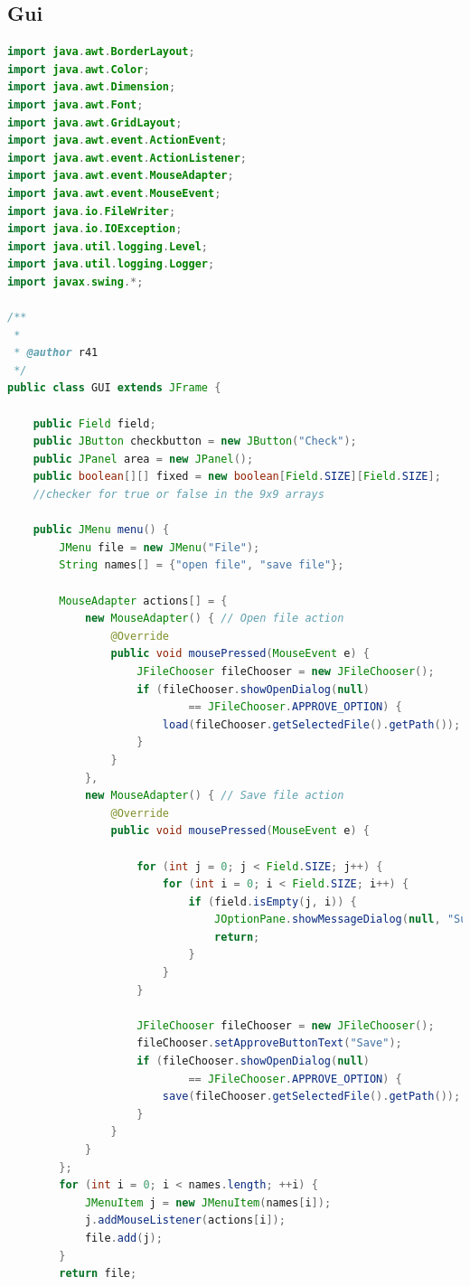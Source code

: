 \documentclass[a4paper,10pt]{article}
\begin{document}
\subsection{Gui}
\begin{lstlisting}[language=java]
import java.awt.BorderLayout;
import java.awt.Color;
import java.awt.Dimension;
import java.awt.Font;
import java.awt.GridLayout;
import java.awt.event.ActionEvent;
import java.awt.event.ActionListener;
import java.awt.event.MouseAdapter;
import java.awt.event.MouseEvent;
import java.io.FileWriter;
import java.io.IOException;
import java.util.logging.Level;
import java.util.logging.Logger;
import javax.swing.*;

/**
 *
 * @author r41
 */
public class GUI extends JFrame {

    public Field field;
    public JButton checkbutton = new JButton("Check");
    public JPanel area = new JPanel();
    public boolean[][] fixed = new boolean[Field.SIZE][Field.SIZE];
    //checker for true or false in the 9x9 arrays

    public JMenu menu() {
        JMenu file = new JMenu("File");
        String names[] = {"open file", "save file"};

        MouseAdapter actions[] = {
            new MouseAdapter() { // Open file action
                @Override
                public void mousePressed(MouseEvent e) {
                    JFileChooser fileChooser = new JFileChooser();
                    if (fileChooser.showOpenDialog(null)
                            == JFileChooser.APPROVE_OPTION) {
                        load(fileChooser.getSelectedFile().getPath());
                    }
                }
            },
            new MouseAdapter() { // Save file action 
                @Override
                public void mousePressed(MouseEvent e) {

                    for (int j = 0; j < Field.SIZE; j++) {
                        for (int i = 0; i < Field.SIZE; i++) {
                            if (field.isEmpty(j, i)) {
                                JOptionPane.showMessageDialog(null, "Sudoku needs to be finished, before saving is an option.");
                                return;
                            }
                        }
                    }

                    JFileChooser fileChooser = new JFileChooser();
                    fileChooser.setApproveButtonText("Save");
                    if (fileChooser.showOpenDialog(null)
                            == JFileChooser.APPROVE_OPTION) {
                        save(fileChooser.getSelectedFile().getPath());
                    }
                }
            }
        };
        for (int i = 0; i < names.length; ++i) {
            JMenuItem j = new JMenuItem(names[i]);
            j.addMouseListener(actions[i]);
            file.add(j);
        }
        return file;


\end{lstlisting}
\end{document}
